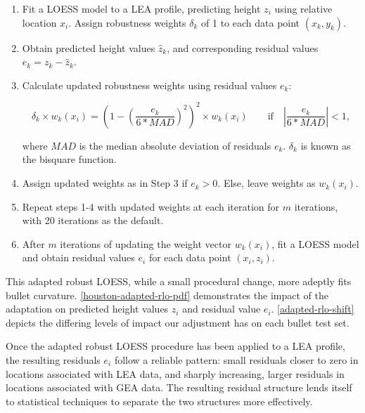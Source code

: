 \documentclass[12pt]{article}
\begin{document}
\begin{enumerate}

\item Fit a LOESS model to a LEA profile, predicting height $z_i$ using relative location $x_i$. Assign robustness weights $\delta_k$ of 1 to each data point $(x_k, y_k)$.  
\item Obtain predicted height values $\widehat{z}_k$, and corresponding residual values $e_k = z_k - \widehat{z}_k$. 
\item Calculate updated robustness weights using residual values $e_k$: 

$$\delta_k \times w_k(x_i) =\left(1 - \left(\frac{e_k}{6*MAD}\right)^2\right)^2 \times w_k(x_i) \quad \quad \mbox{if}\quad \left|\frac{e_k}{6*MAD} \right| < 1,$$

where $MAD$ is the median absolute deviation of residuals $e_k$. $\delta_k$ is known as the bisquare function.  
\item Assign updated weights as in Step 3 if $e_k > 0$. Else, leave weights as $w_k(x_i)$. 
\item Repeat steps 1-4 with updated weights at each iteration for $m$ iterations, with 20 iterations as the default.  
\item After $m$ iterations of updating the weight vector $w_k(x_i)$, fit a LOESS model and obtain residual values $e_i$ for each data point $(x_i, z_i)$.  

\end{enumerate}

This adapted robust LOESS, while a small procedural change, more adeptly
fits bullet curvature. \autoref{houston-adapted-rlo-pdf} demonstrates
the impact of the adaptation on predicted height values \(z_i\) and
residual value \(e_i\). \autoref{adapted-rlo-shift} depicts the
differing levels of impact our adjustment has on each bullet test set.
{\color{teal}{Once I have more barrel information, I could go into a little more detail here about differing barrel types/ammo types or something, but no more than a sentence to bring the point home.}}

Once the adapted robust LOESS procedure has been applied to a LEA
profile, the resulting residuals \(e_i\) follow a reliable pattern:
small residuals closer to zero in locations associated with LEA data,
and sharply increasing, larger residuals in locations associated with
GEA data. The resulting residual structure lends itself to statistical
techniques to separate the two structures more effectively.
\end{document}
